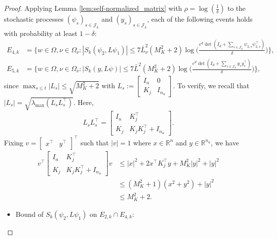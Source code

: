 \documentclass[11pt]{article}
\theoremstyle{plain}
\theoremstyle{definition}
\theoremstyle{remark}
\begin{document}
\begin{proof}
Applying Lemma \ref{lem:self-normalized_matrix} with $\rho=\log(\frac{1}{\delta})$ to the stochastic processes $(\psi_s)_{s\in \mathcal{J}_k}$ and $(y_s)_{s\in \mathcal{J}_k}$, each of the following events holds with probability at least $1-\delta$:
\begin{align*}
E_{4,k} &=\bigg \{w \in \Omega, \nu \in \Omega_{\nu}:|S_k(\psi_{2},L\psi_{1})|\leq 7\bar L_{\nu}^2
(M_K^2+2)\log\bigg(\frac{e^d \det(I_d+\sum_{s \in\mathcal{J}_k}\psi_{2,s}\psi_{2,s}^{\top})}{\delta}\bigg)\bigg\},\\
E_{5,k} &=\bigg \{w \in \Omega, \nu \in \Omega_{\nu}:|S_k(y,L\psi)|\leq 7\bar L^2(M_K^2+2)\log\bigg(\frac{e^d \det(I_d+\sum_{s \in\mathcal{J}_k} y_s y_s^{\top})}{\delta}\bigg)\bigg\},
\end{align*}
since $\max_{s \leq t} |L_s| \leq \sqrt{M_K^2+2}$ 
with $L_s := 
\begin{bmatrix}
    I_n & 0\\
    K_j & I_{n_u}
\end{bmatrix}.$ To verify, we recall that $|L_s| = \sqrt{\lambda_{\max}(L_sL_s^{\top})}$. Here,
\[
L_sL_s^{\top} =
\begin{bmatrix}
    I_{n} &K_j^{\top}\\ 
        K_j & K_jK_j^{\top}+I_{n_u}
    \end{bmatrix}.
\]
Fixing $v=\begin{bmatrix}x^{\top} & y^{\top}\end{bmatrix}^{\top}$ such that $|v|=1$ where $x\in\mathbb{R}^n$ and  $y\in\mathbb{R}^{n_u}$, we have
\begin{align*}
    v^{\top}
    \begin{bmatrix}
    I_{n} &K_j^{\top}\\ 
        K_j & K_jK_j^{\top}+I_{n_u}
    \end{bmatrix}
    v
    &\leq  
    |x|^2+2x^{\top}K_j^{\top}y + M_K^2|y|^2 + |y|^2\\
    &\leq (M_K^2+1)(x^2+y^2)+|y|^2\\
    &\leq M_K^2+2.
\end{align*}
\begin{itemize}
\item Bound of $S_k(\psi_2,L\psi_1)$ on $E_{2,k}\cap E_{4,k}$:


\end{itemize}
\end{proof}
\end{document}
